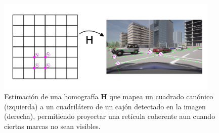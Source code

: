 \begin{figure}[!ht]
    \centering
    \includegraphics[width=0.95\textwidth]{img/3-metodo/transformacion.png}
    \caption{Estimación de una homografía \(\mathbf{H}\) que mapea un cuadrado canónico (izquierda) a un cuadrilátero de un cajón detectado en la imagen (derecha), permitiendo proyectar una retícula coherente aun cuando ciertas marcas no sean visibles.}
    \label{fig:ramsac-transform}
\end{figure}
